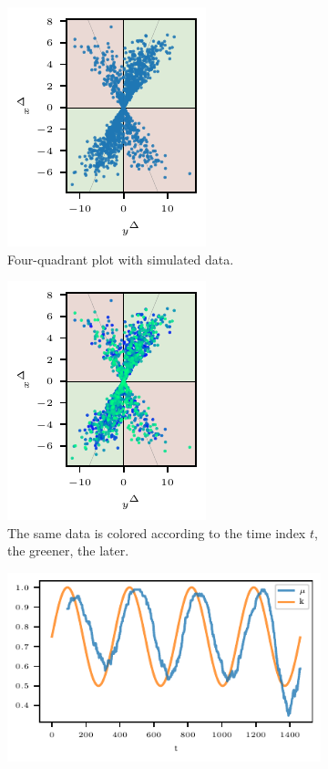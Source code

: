 \begin{figure}
    \centering
    \begin{subfigure}[t]{.24\textwidth}
\includegraphics{plots/illustrative_examples/4Q_sample_without_time}
\caption{Four-quadrant plot with simulated data.}\label{fig:trending_basic_4q_sample}
\end{subfigure}\hspace{0.01\textwidth}
\begin{subfigure}[t]{.24\textwidth}
\includegraphics{plots/illustrative_examples/4Q_sample_with_time}
\caption{The same data is colored according to the time index $t$, the greener, the later.}\label{fig:trending_basic_4q_sample_color}
\end{subfigure}\hspace{0.01\textwidth}
\begin{subfigure}[t]{.48\textwidth}
    \includegraphics{plots/illustrative_examples/trending_ratio_time_series.pdf}

\end{subfigure}
\end{figure}
